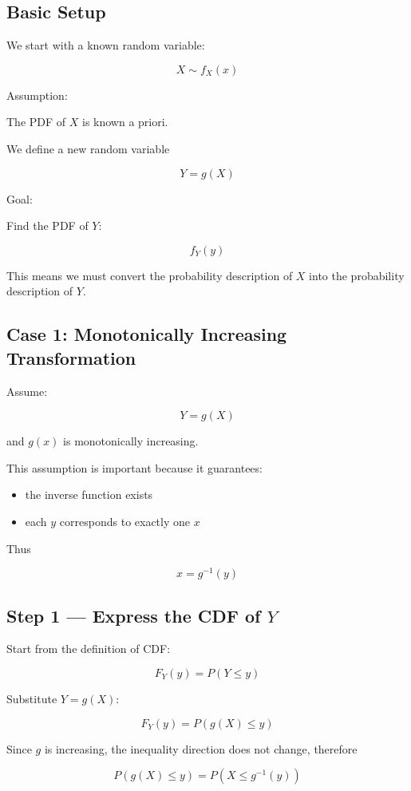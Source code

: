 \documentclass{article}
\begin{document}
\subsection*{Basic Setup}

We start with a known random variable:

\[
X \sim f_X(x)
\]

Assumption:

The PDF of $X$ is known a priori.

We define a new random variable

\[
Y = g(X)
\]

Goal:

Find the PDF of $Y$:

\[
f_Y(y)
\]

This means we must convert the probability description of $X$ into the probability description of $Y$.

\subsection*{Case 1: Monotonically Increasing Transformation}

Assume:

\[
Y = g(X)
\]

and $g(x)$ is monotonically increasing.

This assumption is important because it guarantees:

\begin{itemize}
\item the inverse function exists
\item each $y$ corresponds to exactly one $x$
\end{itemize}

Thus

\[
x = g^{-1}(y)
\]

\subsection*{Step 1 — Express the CDF of $Y$}

Start from the definition of CDF:

\[
F_Y(y) = P(Y \le y)
\]

Substitute $Y = g(X)$:

\[
F_Y(y) = P(g(X) \le y)
\]

Since $g$ is increasing, the inequality direction does not change, therefore

\[
P(g(X) \le y) = P(X \le g^{-1}(y))
\]
\end{document}
